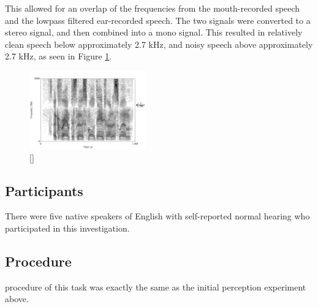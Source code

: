 \DIFaddend This allowed for an overlap of the frequencies from the mouth-recorded speech and the lowpass filtered ear-recorded speech.  The two signals were converted to a stereo signal, and then combined into a mono signal.  This resulted in relatively clean speech below approximately 2.7 kHz, and noisy speech above approximately 2.7 kHz, as seen in Figure \ref{fig:combined-signal}.
\DIFaddbegin \begin{figure}
\centering
  \includegraphics[width=0.45\textwidth]{figure/combined-signal_labeled.png}
  \caption{[] }
  \label{fig:combined-signal}
\end{figure}
\DIFaddend 

\DIFaddbegin \subsection{Participants}
\DIFaddend There were five native speakers of English with self-reported normal hearing who participated in this investigation.  
\DIFdelbegin {}\DIFdelend \DIFaddbegin 

\subsection{Procedure}
\DIFaddend procedure of this task was exactly the same as the initial perception experiment \DIFdelbegin {}\DIFdelend \DIFaddbegin {}\DIFaddend above.


